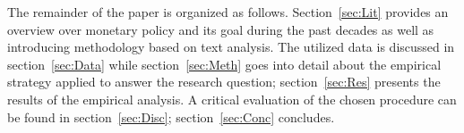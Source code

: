 The remainder of the paper is organized as follows. Section~\ref{sec:Lit} provides an overview over monetary policy and its goal during the past decades as well as introducing methodology based on text analysis. The utilized data is discussed in section~\ref{sec:Data} while section~\ref{sec:Meth} goes into detail about the empirical strategy applied to answer the research question; section~\ref{sec:Res} presents the results of the empirical analysis. A critical evaluation of the chosen procedure can be found in section~\ref{sec:Disc}; section~\ref{sec:Conc} concludes.
%
%